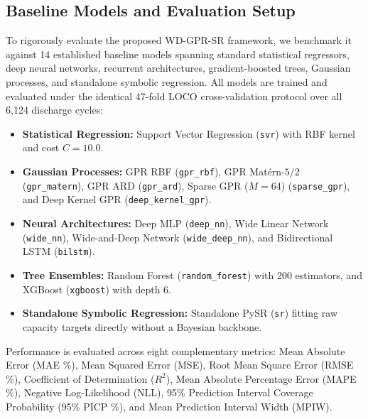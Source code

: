 \documentclass[a4paper,fleqn]{cas-sc}
\begin{document}
\subsection{Baseline Models and Evaluation Setup}
To rigorously evaluate the proposed WD-GPR-SR framework, we benchmark it against 14 established baseline models spanning standard statistical regressors, deep neural networks, recurrent architectures, gradient-boosted trees, Gaussian processes, and standalone symbolic regression. All models are trained and evaluated under the identical 47-fold LOCO cross-validation protocol over all 6,124 discharge cycles:
\begin{itemize}
    \item \textbf{Statistical Regression:} Support Vector Regression (\texttt{svr}) with RBF kernel and cost $C=10.0$.
    \item \textbf{Gaussian Processes:} GPR RBF (\texttt{gpr\_rbf}), GPR Matérn-$5/2$ (\texttt{gpr\_matern}), GPR ARD (\texttt{gpr\_ard}), Sparse GPR ($M=64$) (\texttt{sparse\_gpr}), and Deep Kernel GPR (\texttt{deep\_kernel\_gpr}).
    \item \textbf{Neural Architectures:} Deep MLP (\texttt{deep\_nn}), Wide Linear Network (\texttt{wide\_nn}), Wide-and-Deep Network (\texttt{wide\_deep\_nn}), and Bidirectional LSTM (\texttt{bilstm}).
    \item \textbf{Tree Ensembles:} Random Forest (\texttt{random\_forest}) with 200 estimators, and XGBoost (\texttt{xgboost}) with depth 6.
    \item \textbf{Standalone Symbolic Regression:} Standalone PySR (\texttt{sr}) fitting raw capacity targets directly without a Bayesian backbone.
\end{itemize}

Performance is evaluated across eight complementary metrics: Mean Absolute Error (MAE \%), Mean Squared Error (MSE), Root Mean Square Error (RMSE \%), Coefficient of Determination ($R^2$), Mean Absolute Percentage Error (MAPE \%), Negative Log-Likelihood (NLL), 95\% Prediction Interval Coverage Probability (95\% PICP \%), and Mean Prediction Interval Width (MPIW).
\end{document}
